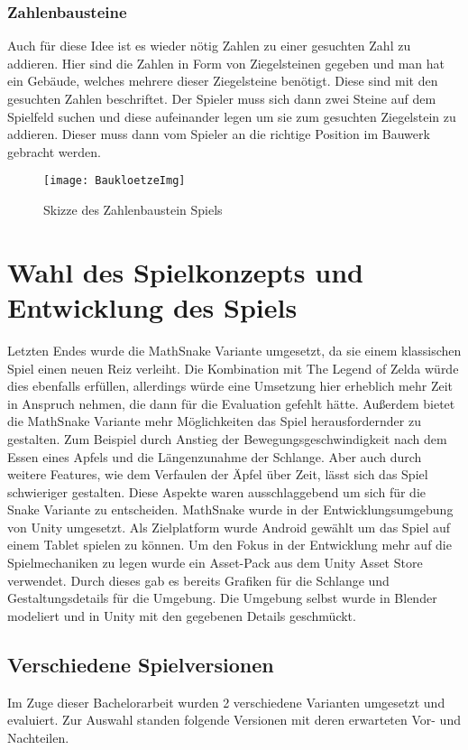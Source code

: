 \subsubsection{Zahlenbausteine}
Auch für diese Idee ist es wieder nötig Zahlen zu einer gesuchten Zahl zu addieren. Hier sind die Zahlen in Form von Ziegelsteinen gegeben und man hat ein Gebäude, welches mehrere dieser Ziegelsteine benötigt. Diese sind mit den gesuchten Zahlen beschriftet. Der Spieler muss sich dann zwei Steine auf dem Spielfeld suchen und diese aufeinander legen um sie zum gesuchten Ziegelstein zu addieren. Dieser muss dann vom Spieler an die richtige Position im Bauwerk gebracht werden.
\begin{figure}[htb]
	\centering
	\texttt{[image: BaukloetzeImg]}
	\caption{Skizze des Zahlenbaustein Spiels\label{fig:baustein}}
\end{figure}
\section{Wahl des Spielkonzepts und Entwicklung des Spiels}
Letzten Endes wurde die MathSnake Variante umgesetzt, da sie einem klassischen Spiel einen neuen Reiz verleiht. Die Kombination mit The Legend of Zelda würde dies ebenfalls erfüllen, allerdings würde eine Umsetzung hier erheblich mehr Zeit in Anspruch nehmen, die dann für die Evaluation gefehlt hätte. Außerdem bietet die MathSnake Variante mehr Möglichkeiten das Spiel herausfordernder zu gestalten. Zum Beispiel durch Anstieg der Bewegungsgeschwindigkeit nach dem Essen eines Apfels und die Längenzunahme der Schlange. Aber auch durch weitere Features, wie dem Verfaulen der Äpfel über Zeit, lässt sich das Spiel schwieriger gestalten. Diese Aspekte waren ausschlaggebend um sich für die Snake Variante zu entscheiden.
MathSnake wurde in der Entwicklungsumgebung von Unity umgesetzt. Als Zielplatform wurde Android gewählt um das Spiel auf einem Tablet spielen zu können. Um den Fokus in der Entwicklung mehr auf die Spielmechaniken zu legen wurde ein Asset-Pack aus dem Unity Asset Store verwendet. Durch dieses gab es bereits Grafiken für die Schlange und Gestaltungsdetails für die Umgebung. Die Umgebung selbst wurde in Blender modeliert und in Unity mit den gegebenen Details geschmückt.
\subsection{Verschiedene Spielversionen}
Im Zuge dieser Bachelorarbeit wurden 2 verschiedene Varianten umgesetzt und evaluiert. Zur Auswahl standen folgende Versionen mit deren erwarteten Vor- und Nachteilen.

